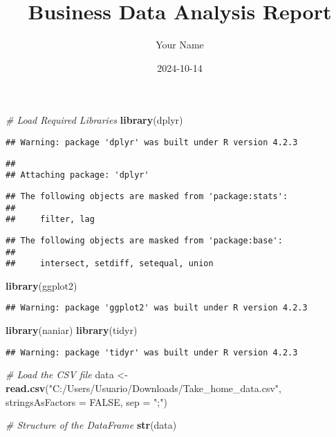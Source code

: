 \documentclass[
]{article}
\title{Business Data Analysis Report}
\author{Your Name}
\date{2024-10-14}
\newenvironment{Shaded}{\begin{snugshade}}{\end{snugshade}}
\newcommand{\AttributeTok}[1]{\textcolor[rgb]{0.13,0.29,0.53}{#1}}
\newcommand{\CommentTok}[1]{\textcolor[rgb]{0.56,0.35,0.01}{\textit{#1}}}
\newcommand{\ConstantTok}[1]{\textcolor[rgb]{0.56,0.35,0.01}{#1}}
\newcommand{\FunctionTok}[1]{\textcolor[rgb]{0.13,0.29,0.53}{\textbf{#1}}}
\newcommand{\NormalTok}[1]{#1}
\newcommand{\OtherTok}[1]{\textcolor[rgb]{0.56,0.35,0.01}{#1}}
\newcommand{\StringTok}[1]{\textcolor[rgb]{0.31,0.60,0.02}{#1}}
\begin{document}
\maketitle

\begin{Shaded}
\begin{Highlighting}[]
\CommentTok{\# Load Required Libraries}
\FunctionTok{library}\NormalTok{(dplyr)}
\end{Highlighting}
\end{Shaded}

\begin{verbatim}
## Warning: package 'dplyr' was built under R version 4.2.3
\end{verbatim}

\begin{verbatim}
## 
## Attaching package: 'dplyr'
\end{verbatim}

\begin{verbatim}
## The following objects are masked from 'package:stats':
## 
##     filter, lag
\end{verbatim}

\begin{verbatim}
## The following objects are masked from 'package:base':
## 
##     intersect, setdiff, setequal, union
\end{verbatim}

\begin{Shaded}
\begin{Highlighting}[]
\FunctionTok{library}\NormalTok{(ggplot2)}
\end{Highlighting}
\end{Shaded}

\begin{verbatim}
## Warning: package 'ggplot2' was built under R version 4.2.3
\end{verbatim}

\begin{Shaded}
\begin{Highlighting}[]
\FunctionTok{library}\NormalTok{(naniar)}
\FunctionTok{library}\NormalTok{(tidyr)}
\end{Highlighting}
\end{Shaded}

\begin{verbatim}
## Warning: package 'tidyr' was built under R version 4.2.3
\end{verbatim}

\begin{Shaded}
\begin{Highlighting}[]
\CommentTok{\# Load the CSV file}
\NormalTok{data }\OtherTok{\textless{}{-}} \FunctionTok{read.csv}\NormalTok{(}\StringTok{"C:/Users/Usuario/Downloads/Take\_home\_data.csv"}\NormalTok{, }\AttributeTok{stringsAsFactors =} \ConstantTok{FALSE}\NormalTok{, }\AttributeTok{sep =} \StringTok{";"}\NormalTok{)}

\CommentTok{\# Structure of the DataFrame}
\FunctionTok{str}\NormalTok{(data)}
\end{Highlighting}
\end{Shaded}
\end{document}
